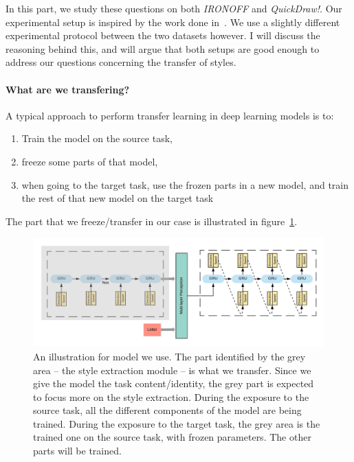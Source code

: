   \par In this part, we study these questions on both \textit{IRONOFF} and \textit{QuickDraw!}. Our experimental setup is inspired by the work done in~\citep{8686063}. We use a slightly different experimental protocol between the two datasets however. I will discuss the reasoning behind this, and will argue that both setups are good enough to address our questions concerning the transfer of styles.

  \paragraph{What are we transfering?} A typical approach to perform transfer learning in deep learning models is to:
    \begin{enumerate}
      \item Train the model on the source task,
      \item freeze some parts of that model,
      \item when going to the target task, use the frozen parts in a new model, and train the rest of that new model on the target task
    \end{enumerate}

    The part that we freeze/transfer in our case is illustrated in figure~\ref{fig:transfer_part_illustration}.
  \begin{figure}
    \includegraphics[scale=0.95]{./images/sota/transfer_part.jpeg}
    \caption{An illustration for model we use. The part identified by the grey area -- the style extraction module -- is what we transfer. Since we give the model the task content/identity, the grey part is expected to focus more on the style extraction. During the exposure to the source task, all the different components of the model are being trained. During the exposure to the target task, the grey area is the trained one on the source task, with frozen parameters. The other parts will be trained.}
    \label{fig:transfer_part_illustration}
  \end{figure}


